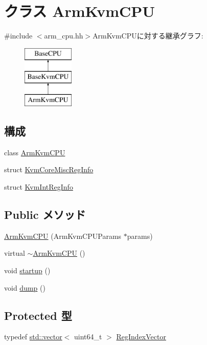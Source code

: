 \hypertarget{classArmKvmCPU}{
\section{クラス ArmKvmCPU}
\label{classArmKvmCPU}
}


{\ttfamily \#include $<$arm\_\-cpu.hh$>$}ArmKvmCPUに対する継承グラフ:\begin{figure}[H]
\begin{center}
\leavevmode
\includegraphics[height=3cm]{classArmKvmCPU}
\end{center}
\end{figure}
\subsection*{構成}
\begin{DoxyCompactItemize}
\item 
class \hyperlink{classArmKvmCPU_1_1ArmKvmCPU}{ArmKvmCPU}
\item 
struct \hyperlink{structArmKvmCPU_1_1KvmCoreMiscRegInfo}{KvmCoreMiscRegInfo}
\item 
struct \hyperlink{structArmKvmCPU_1_1KvmIntRegInfo}{KvmIntRegInfo}
\end{DoxyCompactItemize}
\subsection*{Public メソッド}
\begin{DoxyCompactItemize}
\item 
\hyperlink{classArmKvmCPU_ab1eb352efa2b1da33f37cf592ffb2b00}{ArmKvmCPU} (ArmKvmCPUParams $\ast$params)
\item 
virtual \hyperlink{classArmKvmCPU_a5a7b2abd8e0f6124ff58343a788dfc1d}{$\sim$ArmKvmCPU} ()
\item 
void \hyperlink{classArmKvmCPU_aecc7d8debf54990ffeaaed5bac7d7d81}{startup} ()
\item 
void \hyperlink{classArmKvmCPU_accd2600060dbaee3a3b41aed4034c63c}{dump} ()
\end{DoxyCompactItemize}
\subsection*{Protected 型}
\begin{DoxyCompactItemize}
\item 
typedef \hyperlink{classstd_1_1vector}{std::vector}$<$ uint64\_\-t $>$ \hyperlink{classArmKvmCPU_acba61563c19ad813c8026d8746e8bded}{RegIndexVector}
\end{DoxyCompactItemize}
